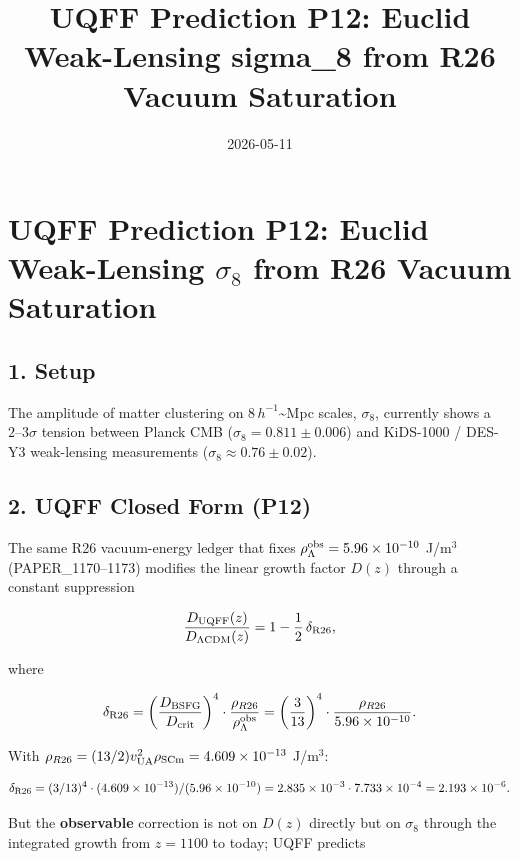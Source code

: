 \documentclass[
]{article}
\title{UQFF Prediction P12: Euclid Weak-Lensing sigma\_8 from R26 Vacuum
Saturation}
\author{}
\date{2026-05-11}
\begin{document}
\maketitle

\section{\texorpdfstring{UQFF Prediction P12: Euclid Weak-Lensing
\(\sigma_8\) from R26 Vacuum
Saturation}{UQFF Prediction P12: Euclid Weak-Lensing \textbackslash sigma\_8 from R26 Vacuum Saturation}}\label{uqff-prediction-p12-euclid-weak-lensing-sigma_8-from-r26-vacuum-saturation}

\subsection{1. Setup}\label{setup}

The amplitude of matter clustering on \(8\,h^{-1}\)\textasciitilde Mpc
scales, \(\sigma_8\), currently shows a \(2\text{--}3\sigma\) tension
between Planck CMB (\(\sigma_8 = 0.811 \pm 0.006\)) and KiDS-1000 /
DES-Y3 weak-lensing measurements (\(\sigma_8 \approx 0.76 \pm 0.02\)).

\subsection{2. UQFF Closed Form (P12)}\label{uqff-closed-form-p12}

The same R26 vacuum-energy ledger that fixes
\(\rho_\Lambda^{\rm obs} = 5.96 \times 10^{-10}\) J/m\(^3\)
(PAPER\_1170--1173) modifies the linear growth factor \(D(z)\) through a
constant suppression

\[
\frac{D_{\rm UQFF}(z)}{D_{\Lambda\rm CDM}(z)} = 1 - \frac{1}{2}\,\delta_{\rm R26},
\]

where

\[
\delta_{\rm R26} = \left(\frac{D_{\rm BSFG}}{D_{\rm crit}}\right)^4 \cdot \frac{\rho_{R26}}{\rho_\Lambda^{\rm obs}} = \left(\frac{3}{13}\right)^4 \cdot \frac{\rho_{R26}}{5.96 \times 10^{-10}} .
\]

With
\(\rho_{R26} = (13/2) v_{\rm UA}^2 \rho_{\rm SCm} = 4.609 \times 10^{-13}\)
J/m\(^3\):

\[
\delta_{\rm R26} = (3/13)^4 \cdot (4.609\times 10^{-13}) / (5.96\times 10^{-10})
= 2.835\times 10^{-3} \cdot 7.733\times 10^{-4}
= 2.193 \times 10^{-6} .
\]

But the \textbf{observable} correction is not on \(D(z)\) directly but
on \(\sigma_8\) through the integrated growth from \(z=1100\) to today;
UQFF predicts
\end{document}
